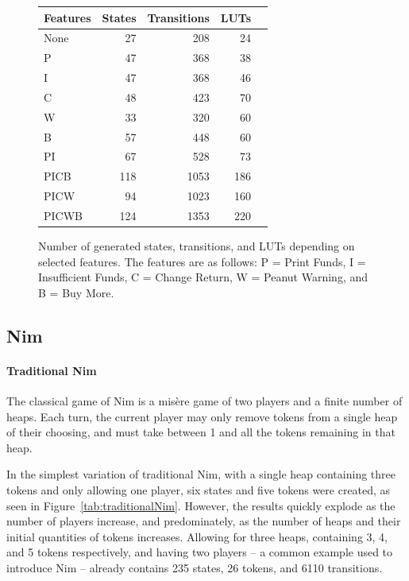 \documentclass[sigplan,anonymous,review]{acmart}
\begin{document}
\begin{figure}
    \centering
\begin{tabular}{lrrrr}\toprule
Features &States &Transitions &LUTs \\\midrule
None &27 &208 &24 \\
P &47 &368 &38 \\
I &47 &368 &46 \\
C &48 &423 &70 \\
W &33 &320 &60 \\
B &57 &448 &60 \\
PI &67 &528 &73 \\
PICB &118 &1053 &186 \\
PICW &94 &1023 &160 \\
PICWB &124 &1353 &220 \\
\bottomrule
\end{tabular}
    \caption{Number of generated states, transitions, and LUTs depending on selected features. The features are as follows: P = Print Funds, I = Insufficient Funds, C = Change Return, W = Peanut Warning, and B = Buy More.}
    \label{fig:vmData}
\end{figure}

\subsection{Nim}\label{sec:nim}
\paragraph{Traditional Nim}
The classical game of Nim is a mis\`{e}re game of two players and a finite number of heaps. Each turn, the current player may only remove tokens from a single heap of their choosing, and must take between 1 and all the tokens remaining in that heap. 

In the simplest variation of traditional Nim, with a single heap containing three tokens and only allowing one player, six states and five tokens were created, as seen in Figure~\ref{tab:traditionalNim}. However, the results quickly explode as the number of players increase, and predominately, as the number of heaps and their initial quantities of tokens increases. Allowing for three heaps, containing 3, 4, and 5 tokens respectively, and having two players -- a common example used to introduce Nim -- already contains 235 states, 26 tokens, and 6110 transitions. 
\end{document}
